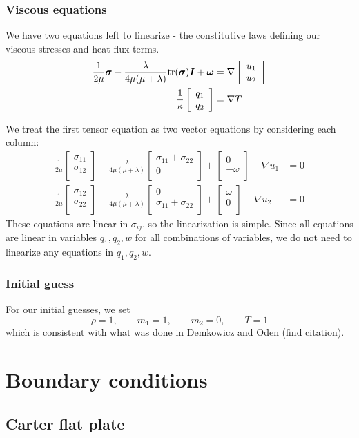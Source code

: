 \documentclass{article}
\newcommand{\grad}{\nabla}
\def\vecttwo#1#2{\left[
\begin{array}{c}
#1\\
#2\\
\end{array}
\right]}
\begin{document}
\subsubsection{Viscous equations}
We have two equations left to linearize - the constitutive laws defining our viscous stresses and heat flux terms. 
\begin{align*}
\frac{1}{2\mu}{\boldsymbol \sigma}- \frac{\lambda}{4\mu(\mu+\lambda)}{\rm tr}({\boldsymbol \sigma}){\boldsymbol I} + {\boldsymbol \omega} &= 
\grad
\left[\begin{array}{c}
u_1\\
u_2
\end{array}
\right]\\
\frac{1}{\kappa}
\left[\begin{array}{c}
q_1\\
q_2
\end{array}\right] &=
\grad T
\end{align*}

We treat the first tensor equation as two vector equations by considering each column:
\begin{align*}
\frac{1}{2\mu} \vecttwo{\sigma_{11}}{\sigma_{12}} - \frac{\lambda}{4\mu(\mu+\lambda)}\vecttwo{\sigma_{11}+\sigma_{22}}{0} + \vecttwo{0}{-\omega} - \grad u_1&= 0 \\
\frac{1}{2\mu} \vecttwo{\sigma_{12}}{\sigma_{22}} - \frac{\lambda}{4\mu(\mu+\lambda)}\vecttwo{0}{\sigma_{11}+\sigma_{22}} + \vecttwo{\omega}{0} - \grad u_2 &= 0
\end{align*}
These equations are linear in $\sigma_{ij}$, so the linearization is simple. 
Since all equations are linear in variables $q_1, q_2, w$ for all combinations of variables, we do not need to linearize any equations in $q_1, q_2, w$. 

\subsubsection{Initial guess}

For our initial guesses, we set
\[
\rho = 1,\qquad m_1= 1,\qquad m_2 = 0, \qquad T = 1
\]
which is consistent with what was done in Demkowicz and Oden (find citation). 

\section{	Boundary conditions}

\subsection{Carter flat plate}
\end{document}
